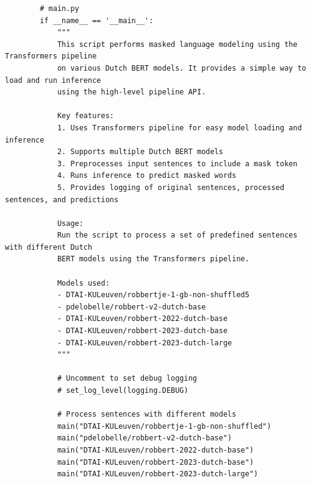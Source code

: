 \begin{listing}
    \begin{verbatim}
        # main.py
        if __name__ == '__main__':
            """
            This script performs masked language modeling using the Transformers pipeline
            on various Dutch BERT models. It provides a simple way to load and run inference
            using the high-level pipeline API.
            
            Key features:
            1. Uses Transformers pipeline for easy model loading and inference
            2. Supports multiple Dutch BERT models
            3. Preprocesses input sentences to include a mask token
            4. Runs inference to predict masked words
            5. Provides logging of original sentences, processed sentences, and predictions
            
            Usage:
            Run the script to process a set of predefined sentences with different Dutch
            BERT models using the Transformers pipeline.
            
            Models used:
            - DTAI-KULeuven/robbertje-1-gb-non-shuffled5
            - pdelobelle/robbert-v2-dutch-base
            - DTAI-KULeuven/robbert-2022-dutch-base
            - DTAI-KULeuven/robbert-2023-dutch-base
            - DTAI-KULeuven/robbert-2023-dutch-large
            """
            
            # Uncomment to set debug logging
            # set_log_level(logging.DEBUG)
            
            # Process sentences with different models
            main("DTAI-KULeuven/robbertje-1-gb-non-shuffled")
            main("pdelobelle/robbert-v2-dutch-base")
            main("DTAI-KULeuven/robbert-2022-dutch-base")
            main("DTAI-KULeuven/robbert-2023-dutch-base")
            main("DTAI-KULeuven/robbert-2023-dutch-large")
    \end{verbatim}
    \caption[\texttt{main.py} (deel 2)]{Het tweede deel van \texttt{main.py} voert de hoofdtoepassing uit, waarbij gebruik wordt gemaakt van een lijst met vooraf gedefinieerde modellen. Dit gedeelte initialiseert het script door verschillende \gls{robbert}-modellen te testen en de inferentie uit te voeren op de vooraf bepaalde zinnen. Het documenteert de kernfuncties en gebruiksinstructies in de \texttt{docstring} voor verduidelijking en instructies.}
    \label{lst:main-part2}
\end{listing}

